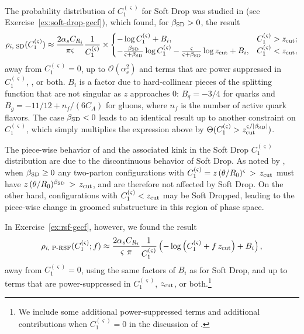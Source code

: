 The probability distribution of \(C_1^{(\varsigma)}\) for Soft Drop was studied in  (see Exercise~\ref{ex:soft-drop-gecf}), which found, for \(\beta_{\rm SD} > 0\), the  result
\begin{align}
    \label{eq:sd_lo}
    \rho_{i,\,\,\text{SD}}(C_1^{(\varsigma)})
    \approx
    \frac{2\alpha_s C_{R_i}}{\pi \varsigma} \frac{1}{C_1^{(\varsigma)}}
    \times
    \begin{cases}
        -\log C_1^{(\varsigma)} + B_i,
        &
        C_1^{(\varsigma)} > \zcut;
        \\
        -
        \frac{\beta_{\rm SD}}{\varsigma+\beta_{\rm SD}} \log C_1^{(\varsigma)}
        -
        \frac{\varsigma}{\varsigma+\beta_{\rm SD}}\log \zcut
        +
        B_i,
        &
        C_1^{(\varsigma)} < \zcut,
    \end{cases}
\end{align}
away from \(C_1^{(\varsigma)} = 0\), up to \(\mathcal{O}(\alpha_s^2)\) and terms that are power suppressed in \(C_1^{(\varsigma)}\), \zcut, or both.
%
\(B_i\) is a factor due to hard-collinear pieces of the splitting function that are not singular as \(z\) approaches 0:
%
$B_q = -3/4$ for quarks and $B_g = -11/12+n_f/(6 C_A)$ for gluons, where $n_f$ is the number of active quark flavors.
%
The case \(\beta_{\rm SD} < 0\) leads to an identical result up to another constraint on \(C_1^{(\varsigma)}\), which simply multiplies the expression above by \(\Theta(C_1^{(\varsigma)} > z_{\rm cut}^{\varsigma/ |\beta_{\rm SD}|})\).

The piece-wise behavior of  and the associated kink in the Soft Drop \(C_1^{(\varsigma)}\) distribution are due to the discontinuous behavior of Soft Drop.
%
As noted by , when \(\beta_{\rm SD} \geq 0\) any two-parton configurations with \(C_1^{(\varsigma)} = z \, (\theta/R_0)^\varsigma \, > \, z_{\rm cut}\) must have \(z \, (\theta/R_0)^{\beta_{\rm SD}} \, > \, z_{\rm cut}\), and are therefore not affected by Soft Drop.
%
On the other hand, configurations with \(C_1^{(\varsigma)} < z_{\rm cut}\) may be Soft Dropped, leading to the piece-wise change in groomed substructure in this region of phase space.

In Exercise~\ref{ex:rsf-gecf}, however, we found the  result
\begin{equation}
    \rho_{i,\,\,\text{P-RSF}}(C_1^{(\varsigma)}; f)
    \approx
    \frac{2\alpha_s C_{R_i}}{\varsigma~\pi}
    \frac{1}{C_1^{(\varsigma)}}
    \left(
        -\log\left(C_1^{(\varsigma)} + f\,\zcut\right)
        + B_i
    \right),
    \label{eq:prsf_LO}
\end{equation}
away from \(C_1^{(\varsigma)} = 0\), using the same factors of \(B_i\) as for Soft Drop, and up to terms that are power-suppressed in \(C_1^{(\varsigma)}\), \(z_{\rm cut}\), or both.\footnote{
We include some additional power-suppressed terms and additional contributions when \(C_1^{(\varsigma)} = 0\) in the  discussion of .
}

